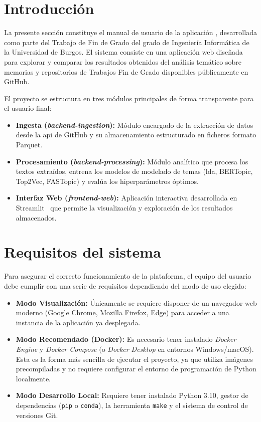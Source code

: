 
\section{Introducción}
La presente sección constituye el manual de usuario de la aplicación
\nombreProyecto, desarrollada como parte del Trabajo de Fin de Grado del grado
de Ingeniería Informática de la Universidad de Burgos. El sistema consiste en
una aplicación web diseñada para explorar y comparar los resultados obtenidos
del análisis temático sobre memorias y repositorios de Trabajos Fin de Grado
disponibles públicamente en GitHub.

El proyecto se estructura en tres módulos principales de forma transparente
para el usuario final:
\begin{itemize}
    \item \textbf{Ingesta (\textit{backend-ingestion}):} Módulo encargado de la extracción de datos desde la \acrshort{api} de GitHub y su almacenamiento estructurado en ficheros formato Parquet.
    \item \textbf{Procesamiento (\textit{backend-processing}):} Módulo analítico que procesa los textos extraídos, entrena los modelos de modelado de temas (\acrshort{lda}, BERTopic, Top2Vec, FASTopic) y evalúa los hiperparámetros óptimos.
    \item \textbf{Interfaz Web (\textit{frontend-web}):} Aplicación interactiva desarrollada en Streamlit~\cite{StreamlitDocsa} que permite la visualización y exploración de los resultados almacenados.
\end{itemize}

\section{Requisitos del sistema}
Para asegurar el correcto funcionamiento de la plataforma, el equipo del
usuario debe cumplir con una serie de requisitos dependiendo del modo de uso
elegido:

\begin{itemize}
    \item \textbf{Modo Visualización:} Únicamente se requiere disponer de un navegador web moderno (Google Chrome, Mozilla Firefox, Edge) para acceder a una instancia de la aplicación ya desplegada.
    \item \textbf{Modo Recomendado (Docker):} Es necesario tener instalado \textit{Docker Engine} y \textit{Docker Compose} (o \textit{Docker Desktop} en entornos Windows/macOS). Esta es la forma más sencilla de ejecutar el proyecto, ya que utiliza imágenes precompiladas y no requiere configurar el entorno de programación de Python localmente.
    \item \textbf{Modo Desarrollo Local:} Requiere tener instalado Python 3.10, gestor de dependencias (\texttt{pip} o \texttt{conda}), la herramienta \texttt{make} y el sistema de control de versiones Git.
\end{itemize}

